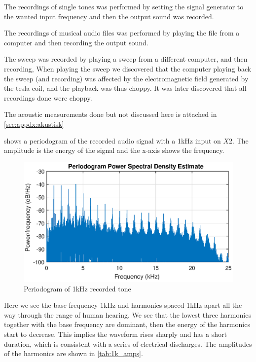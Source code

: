The recordings of single tones was performed by setting the signal generator to the wanted input frequency and then the output sound was recorded.

The recordings of musical audio files was performed by playing the file from a computer and then recording the output sound.

The sweep was recorded by playing a sweep from a different computer, and then recording, When playing the sweep we discovered that the computer playing back the sweep (and recording) was affected by the electromagnetic field generated by the tesla coil, and the playback was thus choppy. It was later discovered that all recordings done were choppy.

The acoustic measurements done but not discussed here is attached in \cref{sec:appdx:akustisk}







 shows a periodogram of the recorded audio signal with a 1kHz input on $X2$. The amplitude is the energy of the signal and the x-axis shows the frequency.
\begin{figure}[H]
    \centering
    \includegraphics[trim={0cm 1.6cm 0cm 2cm},clip,width=\textwidth]{img/Periodogram_1khz-09.eps}
    \caption{Periodogram of 1kHz recorded tone}
    \label{fig:period_1k}
\end{figure}

Here we see the base frequency 1kHz and harmonics spaced 1kHz apart all the way through the range of human hearing. We see that the lowest three harmonics together with the base frequency are dominant, then the energy of the harmonics start to decrease. This implies the waveform rises sharply and has a short duration, which is consistent with a series of electrical discharges. The amplitudes of the harmonics are shown in \cref{tab:1k_amps}.

